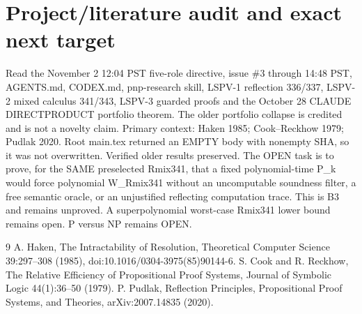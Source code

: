 \documentclass[11pt]{article}
\begin{document}
\section{Project/literature audit and exact next target}
Read the November 2 12:04 PST five-role directive, issue \#3 through 14:48 PST, AGENTS.md, CODEX.md, pnp-research skill, LSPV-1 reflection 336/337, LSPV-2 mixed calculus 341/343, LSPV-3 guarded proofs and the October 28 CLAUDE DIRECTPRODUCT portfolio theorem. The older portfolio collapse is credited and is not a novelty claim. Primary context: Haken 1985; Cook--Reckhow 1979; Pudlak 2020. Root main.tex returned an EMPTY body with nonempty SHA, so it was not overwritten. Verified older results preserved.
The OPEN task is to prove, for the SAME preselected Rmix341, that a fixed polynomial-time P_k would force polynomial \overline W_{Rmix341} without an uncomputable soundness filter, a free semantic oracle, or an unjustified reflecting computation trace. This is B3 and remains unproved. A superpolynomial worst-case Rmix341 lower bound remains open. P versus NP remains OPEN.
\begin{thebibliography}{9}
 A. Haken, The Intractability of Resolution, Theoretical Computer Science 39:297--308 (1985), doi:10.1016/0304-3975(85)90144-6.
 S. Cook and R. Reckhow, The Relative Efficiency of Propositional Proof Systems, Journal of Symbolic Logic 44(1):36--50 (1979).
 P. Pudlak, Reflection Principles, Propositional Proof Systems, and Theories, arXiv:2007.14835 (2020).
\end{thebibliography}
\end{document}
